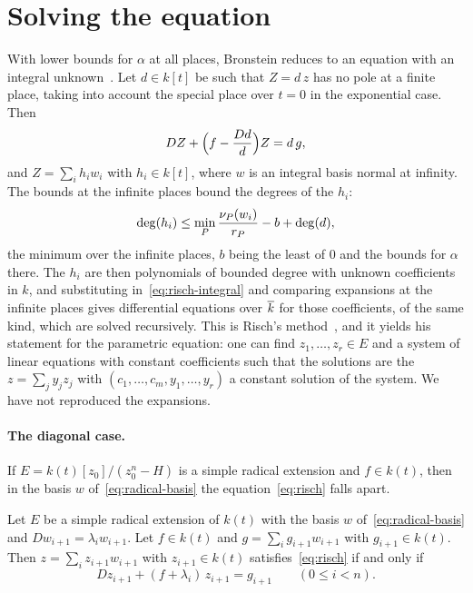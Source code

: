 \section{Solving the equation}\label{sec:rde-solving}

With lower bounds for $\alpha$ at all places, Bronstein reduces to an
equation with an integral unknown~\cite[Proposition~3.7]{bronstein1990}. Let
$d \in k[t]$ be such that $Z = d\,z$ has no pole at a finite place, taking
into account the special place over $t = 0$ in the exponential case. Then
\begin{equation}\label{eq:risch-integral}
  DZ + \Bigl( f - \frac{Dd}{d} \Bigr) Z = d\,g ,
\end{equation}
and $Z = \sum_i h_i w_i$ with $h_i \in k[t]$, where $w$ is an integral basis
normal at infinity. The bounds at the infinite places bound the degrees of
the $h_i$:
\[
  \deg(h_i) \le \min_P \frac{\nu_{P}(w_i)}{r_P} - b + \deg(d),
\]
the minimum over the infinite places, $b$ being the least of $0$ and the
bounds for $\alpha$ there. The $h_i$ are then polynomials of bounded degree
with unknown coefficients in $k$, and substituting
in~\eqref{eq:risch-integral} and comparing expansions at the infinite places
gives differential equations over $\overline{k}$ for those coefficients, of the same
kind, which are solved recursively. This is Risch's
method~\cite[pp.~209--211 and~216--219]{raab2022}, and it yields his
statement for the parametric equation: one can find $z_1, \dots, z_r \in E$
and a system of linear equations with constant coefficients such that the
solutions are the $z = \sum_j y_j z_j$ with $(c_1, \dots, c_m, y_1, \dots,
y_r)$ a constant solution of the system. We have not reproduced the
expansions.

\paragraph{The diagonal case.} If $E = k(t)[z_0]/(z_0^n - H)$ is a simple
radical extension and $f \in k(t)$, then in the basis $w$
of~\eqref{eq:radical-basis} the equation~\eqref{eq:risch} falls apart.

\begin{proposition}\label{prop:rde-radical}
Let $E$ be a simple radical extension of $k(t)$ with the basis $w$
of~\eqref{eq:radical-basis} and $Dw_{i+1} = \lambda_i w_{i+1}$. Let $f \in
k(t)$ and $g = \sum_i g_{i+1} w_{i+1}$ with $g_{i+1} \in k(t)$. Then $z = \sum_i
z_{i+1} w_{i+1}$ with $z_{i+1} \in k(t)$ satisfies~\eqref{eq:risch} if and
only if
\[
  Dz_{i+1} + (f + \lambda_i)\, z_{i+1} = g_{i+1} \qquad (0 \le i < n).
\]
\end{proposition}

